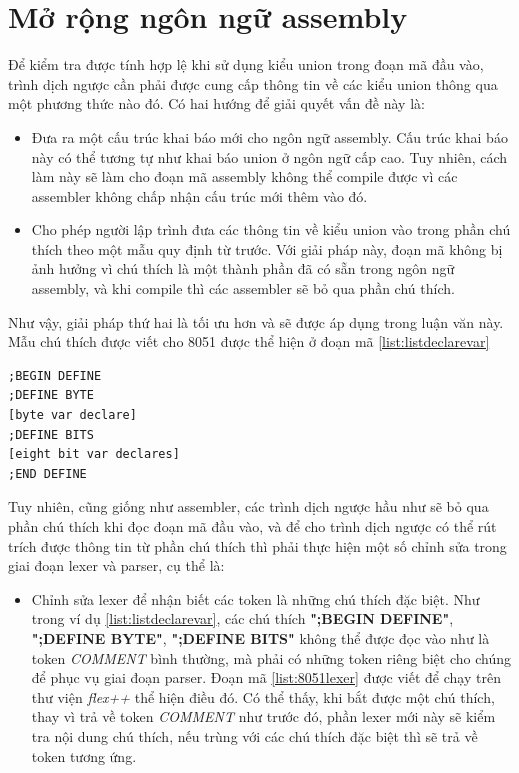 \section{Mở rộng ngôn ngữ assembly}
Để kiểm tra được tính hợp lệ khi sử dụng kiểu union trong đoạn mã đầu vào, trình dịch ngược cần phải được cung cấp thông tin về các kiểu union thông qua một phương thức nào đó. Có hai hướng để giải quyết vấn đề này là:
\begin{itemize}
	\item Đưa ra một cấu trúc khai báo mới cho ngôn ngữ assembly. Cấu trúc khai báo này có thể tương tự như khai báo union ở ngôn ngữ cấp cao. Tuy nhiên, cách làm này sẽ làm cho đoạn mã assembly không thể compile được vì các assembler không chấp nhận cấu trúc mới thêm vào đó.
	\item Cho phép người lập trình đưa các thông tin về kiểu union vào trong phần chú thích theo một mẫu quy định từ trước. Với giải pháp này, đoạn mã không bị ảnh hưởng vì chú thích là một thành phần đã có sẵn trong ngôn ngữ assembly, và khi compile thì các assembler sẽ bỏ qua phần chú thích.
\end{itemize}
Như vậy, giải pháp thứ hai là tối ưu hơn và sẽ được áp dụng trong luận văn này. Mẫu chú thích được viết cho 8051 được thể hiện ở đoạn mã \ref{list:listdeclarevar}
\begin{lstlisting}[caption={Mẫu khai báo bộ biến},label={list:listdeclarevar}]
;BEGIN DEFINE
;DEFINE BYTE
[byte var declare]
;DEFINE BITS
[eight bit var declares]
;END DEFINE
\end{lstlisting}
Tuy nhiên, cũng giống như assembler, các trình dịch ngược hầu như sẽ bỏ qua phần chú thích khi đọc đoạn mã đầu vào, và để cho trình dịch ngược có thể rút trích được thông tin từ phần chú thích thì phải thực hiện một số chỉnh sửa trong giai đoạn lexer và parser, cụ thể là:
\begin{itemize}
	\item Chỉnh sửa lexer để nhận biết các token là những chú thích đặc biệt. Như trong ví dụ \ref{list:listdeclarevar}, các chú thích \textbf{";BEGIN DEFINE"}, \textbf{";DEFINE BYTE"}, \textbf{";DEFINE BITS"} không thể được đọc vào như là token \textit{COMMENT} bình thường, mà phải có những token riêng biệt cho chúng để phục vụ giai đoạn parser. Đoạn mã \ref{list:8051lexer} được viết để chạy trên thư viện \textit{flex++} thể hiện điều đó. Có thể thấy, khi bắt được một chú thích, thay vì trả về token \textit{COMMENT} như trước đó, phần lexer mới này sẽ kiểm tra nội dung chú thích, nếu trùng với các chú thích đặc biệt thì sẽ trả về token tương ứng. 
\end{itemize}
